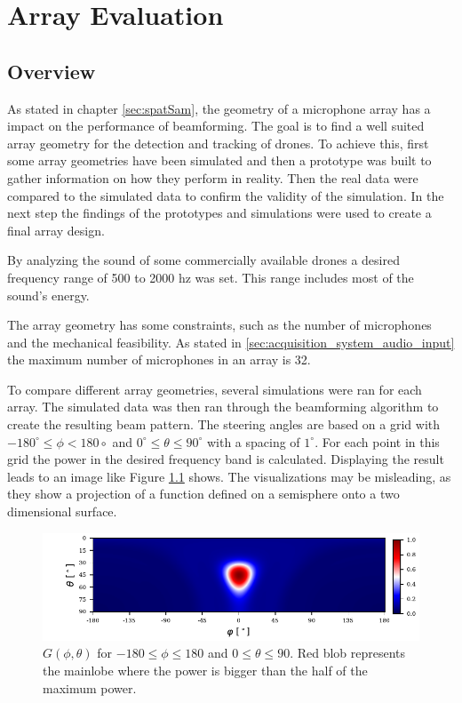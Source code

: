 \chapter{Array Evaluation}
\label{chap:aev}
\section{Overview}
As stated in chapter \ref*{sec:spatSam}, the geometry of a microphone array
has a impact on the performance of beamforming.
The goal is to find a well suited array geometry for the detection and tracking of
drones.
To achieve this, first some array geometries have been simulated and then
a prototype was built to gather information on how they perform in reality.
Then the real data were compared to the simulated data to
confirm the validity of the simulation.
In the next step the findings of the prototypes and simulations
were used to create a final array design.

By analyzing the sound of some commercially available drones
a desired frequency range of 500 to 2000 hz was set.
This range includes most of the sound's energy.

The array geometry has some constraints,
such as the number of microphones and the mechanical feasibility.
As stated in \ref*{sec:acquisition_system_audio_input} the maximum number
of microphones in an array is 32.

To compare different array geometries, several simulations
were ran for each array.
The simulated data was then ran through the beamforming
algorithm to create the resulting beam pattern.
The steering angles are based on a grid with $-180^\circ \leq \phi < 180\circ$ and
$0^\circ \leq \theta \leq 90^\circ$ with a spacing of $1^\circ$.
For each point in this grid the power in the desired frequency band is calculated.
Displaying the result leads to an image like Figure \ref*{aev:fig:gridEx} shows.
The visualizations may be misleading, as they show a projection of 
a function defined on a semisphere onto a two dimensional surface.
\begin{figure}
	\centering
	\includegraphics[]{images/5_array_evaluation/0.3_0.79.pdf}
	\caption{$G(\phi, \theta)$ for $-180 \leq \phi \leq 180$ and $0 \leq \theta \leq 90$.
		Red blob represents the mainlobe where the power is bigger than the half of the
		maximum power.}
	\label{aev:fig:gridEx}
\end{figure}
